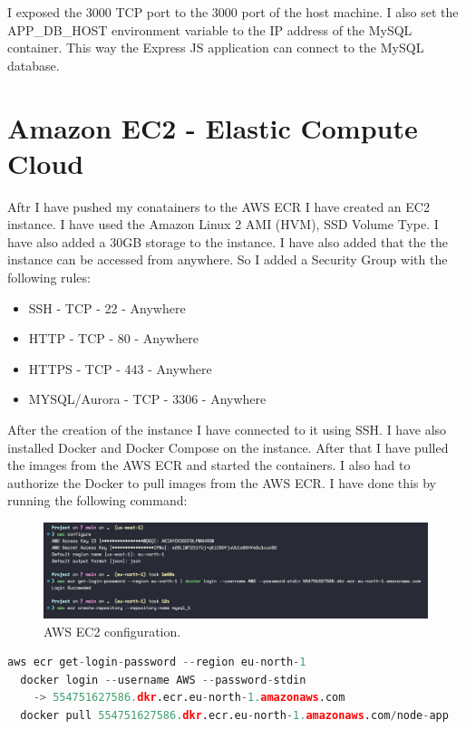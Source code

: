 \documentclass[11pt,a4paper,oneside]{report}
\begin{document}
I exposed the 3000 TCP port to the 3000 port of the host machine. I also set the APP\_DB\_HOST environment variable to the IP address of the MySQL container.
This way the Express JS application can connect to the MySQL database.

\section{Amazon EC2 - Elastic Compute Cloud}
Aftr I have pushed my conatainers to the AWS ECR I have created an EC2 instance. I have used the Amazon Linux 2 AMI (HVM), SSD Volume Type. I have also added a 30GB storage to the instance. I have also added that the the instance can be accessed from anywhere. So I added a Security Group with the following rules:
\begin{itemize}
  \item SSH - TCP - 22 - Anywhere
  \item HTTP - TCP - 80 - Anywhere
  \item HTTPS - TCP - 443 - Anywhere
  \item MYSQL/Aurora - TCP - 3306 - Anywhere
\end{itemize}

After the creation of the instance I have connected to it using SSH. I have also installed Docker and Docker Compose on the instance. After that I have pulled the images from the AWS ECR and started the containers. I also had to authorize the Docker to pull images from the AWS ECR. I have done this by running the following command:

\begin{figure}[h]
  \centering
  \includegraphics[scale=0.45]{aws_configure_ec2.png}
  \caption{AWS EC2 configuration.}
  \label{fig:TexnicCenter}
\end{figure}

\begin{lstlisting}[language=Python,basicstyle=\ttfamily\small,]
  aws ecr get-login-password --region eu-north-1 
  docker login --username AWS --password-stdin 
    -> 554751627586.dkr.ecr.eu-north-1.amazonaws.com
  docker pull 554751627586.dkr.ecr.eu-north-1.amazonaws.com/node-app
\end{lstlisting}
\end{document}

